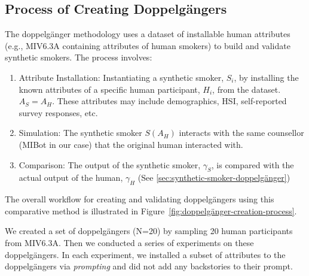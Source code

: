 \subsection{Process of Creating Doppelgängers}
The doppelgänger methodology uses a dataset of installable human attributes (e.g., MIV6.3A containing attributes of human smokers) to build and validate synthetic smokers. The process involves:

\begin{enumerate}
    \item Attribute Installation: Instantiating a synthetic smoker, $S_i$, by installing the known attributes of a specific human participant, $H_i$, from the dataset. $A_S = A_H$. These attributes may include demographics, HSI, self-reported survey responses, etc.
    \item Simulation: The synthetic smoker $S(A_H)$ interacts with the same counsellor (MIBot in our case) that the original human interacted with.
    \item Comparison: The output of the synthetic smoker, $\gamma_S$, is compared with the actual output of the human, $\gamma_H$ (See \cref{sec:synthetic-smoker-doppelgänger})
\end{enumerate}



The overall workflow for creating and validating doppelgängers using this comparative method is illustrated in Figure~\ref{fig:doppelgänger-creation-process}.



We created a set of doppelgängers (N=20) by sampling 20 human participants from MIV6.3A. Then we conducted a series of experiments on these doppelgängers. In each experiment, we installed a subset of attributes to the doppelgängers via \emph{prompting} and did not add any backstories to their prompt.


